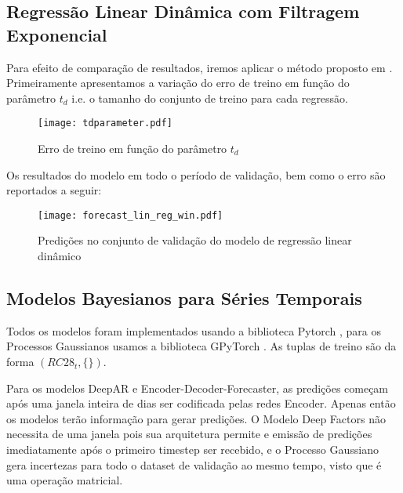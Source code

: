 \subsection{Regressão Linear Dinâmica com Filtragem Exponencial}

Para efeito de comparação de resultados, iremos aplicar o método proposto em
\citep{grecialin}. Primeiramente apresentamos a variação do erro de treino em
função do parâmetro $t_d$ i.e. o tamanho do conjunto de treino para cada
regressão.

\begin{figure}[H]
  \centering
  \texttt{[image: tdparameter.pdf]}
  \caption{Erro de treino em função do parâmetro $t_d$}
  \label{fig:tdparam}
\end{figure}

Os resultados do modelo em todo o período de validação, bem como o erro são
reportados a seguir:

\begin{figure}[H]
  \centering
  \texttt{[image: forecast\_lin\_reg\_win.pdf]}
  \caption{Predições no conjunto de validação do modelo de regressão linear dinâmico}
  \label{fig:tdparam}
\end{figure}

\subsection{Modelos Bayesianos para Séries Temporais}


Todos os modelos foram implementados usando a biblioteca Pytorch \cite{pytorch}, para os Processos Gaussianos usamos a biblioteca GPyTorch \cite{gpytorch}. As tuplas de treino são da forma $(RC28_{t},\{\})$. 

Para os modelos DeepAR e Encoder-Decoder-Forecaster, as predições começam após uma janela inteira de dias ser codificada pelas redes Encoder. Apenas então os modelos terão informação para gerar predições. O Modelo Deep Factors não necessita de uma janela pois sua arquitetura permite e emissão de predições imediatamente após o primeiro timestep ser recebido, e o Processo Gaussiano gera incertezas para todo o dataset de validação ao mesmo tempo, visto que é uma operação matricial. \\


